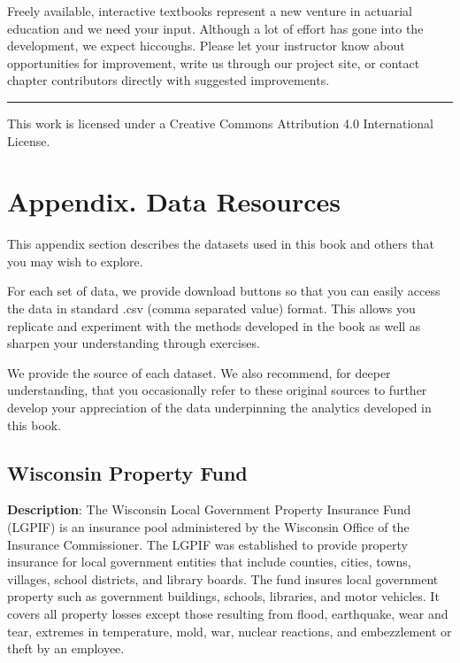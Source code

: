 \documentclass[
  12pt,
  krantz2]{Format/krantzNoCorner}
\begin{document}
Freely available, interactive textbooks represent a new venture in actuarial education and we need your input. Although a lot of effort has gone into the development, we expect hiccoughs. Please let your instructor know about opportunities for improvement, write us through our project site, or contact chapter contributors directly with suggested improvements.

\begin{center}\rule{0.5\linewidth}{0.5pt}\end{center}

This work is licensed under a Creative Commons Attribution 4.0 International License.

\mainmatter

\hypertarget{DataResources}{%
\chapter{Appendix. Data Resources}\label{DataResources}}

This appendix section describes the datasets used in this book and others that you may wish to explore.

For each set of data, we provide download buttons so that you can easily access the data in standard .csv (comma separated value) format. This allows you replicate and experiment with the methods developed in the book as well as sharpen your understanding through exercises.

We provide the source of each dataset. We also recommend, for deeper understanding, that you occasionally refer to these original sources to further develop your appreciation of the data underpinning the analytics developed in this book.

\hypertarget{S:WiscPropFundA}{%
\section{Wisconsin Property Fund}\label{S:WiscPropFundA}}

\textbf{Description}: The Wisconsin Local Government Property Insurance Fund (LGPIF) is an insurance pool administered by the Wisconsin Office of the Insurance Commissioner. The LGPIF was established to provide property insurance for local government entities that include counties, cities, towns, villages, school districts, and library boards. The fund insures local government property such as government buildings, schools, libraries, and motor vehicles. It covers all property losses except those resulting from flood, earthquake, wear and tear, extremes in temperature, mold, war, nuclear reactions, and embezzlement or theft by an employee.
\end{document}
